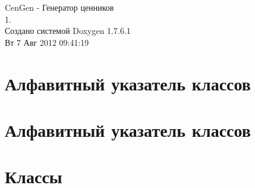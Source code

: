 \documentclass[a4paper]{book}
\begin{document}
\hypersetup{pageanchor=false,citecolor=blue}
\begin{titlepage}
\vspace*{7cm}
\begin{center}
{\Large \-Cen\-Gen -\/ Генератор ценников \\[1ex]\large 1. }\\
\vspace*{1cm}
{\large Создано системой Doxygen 1.7.6.1}\\
\vspace*{0.5cm}
{\small Вт 7 Авг 2012 09:41:19}\\
\end{center}
\end{titlepage}
\clearemptydoublepage
{}
\tableofcontents
\clearemptydoublepage
{}
\hypersetup{pageanchor=true,citecolor=blue}
\chapter{Алфавитный указатель классов}

\chapter{Алфавитный указатель классов}

\chapter{Классы}



























\printindex
\end{document}
